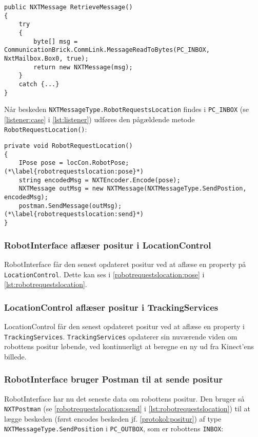 \begin{lstlisting}[style=csharpsmall,label=lst:postman,caption=RetrieveMessage i NXTPostman.]
public NXTMessage RetrieveMessage()
{
    try
    {
        byte[] msg = CommunicationBrick.CommLink.MessageReadToBytes(PC_INBOX, NxtMailbox.Box0, true);
        return new NXTMessage(msg);
    }
    catch {...}
}
\end{lstlisting}

Når beskeden \lstinline[style=csharp]!NXTMessageType.RobotRequestsLocation! findes i \lstinline[style=csharp]!PC_INBOX! (se \cref{listener:case} i \cref{lst:listener}) udføres den pågældende metode \lstinline[style=csharp]!RobotRequestLocation()!:

\begin{lstlisting}[style=csharpsmall,label=lst:robotrequestslocation,caption=RobotRequestsLocation() i RobotInterface.]
private void RobotRequestLocation()
{
    IPose pose = locCon.RobotPose; (*\label{robotrequestslocation:pose}*)
    string encodedMsg = NXTEncoder.Encode(pose);
    NXTMessage outMsg = new NXTMessage(NXTMessageType.SendPostion, encodedMsg);
    postman.SendMessage(outMsg); (*\label{robotrequestslocation:send}*)
}
\end{lstlisting}

\subsubsection{RobotInterface aflæser positur i LocationControl}
RobotInterface får den senest opdateret positur ved at aflæse en property på \lstinline[style=csharp]!LocationControl!.
Dette kan ses i \cref{robotrequestslocation:pose} i \cref{lst:robotrequestslocation}.

\subsubsection{LocationControl aflæser positur i TrackingServices}
LocationControl får den senest opdateret positur ved at aflæse en property i \lstinline[style=csharp]!TrackingServices!.
\lstinline[style=csharp]!TrackingServices! opdaterer sin nuværende viden om robottens positur løbende, ved kontinuerligt at beregne en ny ud fra Kinect'ens billede.

\subsubsection{RobotInterface bruger Postman til at sende positur}
RobotInterface har nu det seneste data om robottens positur.
Den bruger så \lstinline[style=csharp]!NXTPostman! (se \cref{robotrequestslocation:send} i \cref{lst:robotrequestslocation}) til at lægge beskeden (først encodes beskeden jf. \cref{protokol:positur}) af type \lstinline[style=csharp]!NXTMessageType.SendPosition! i \lstinline[style=csharp]!PC_OUTBOX!, som er robottens \lstinline[style=c]!INBOX!:

